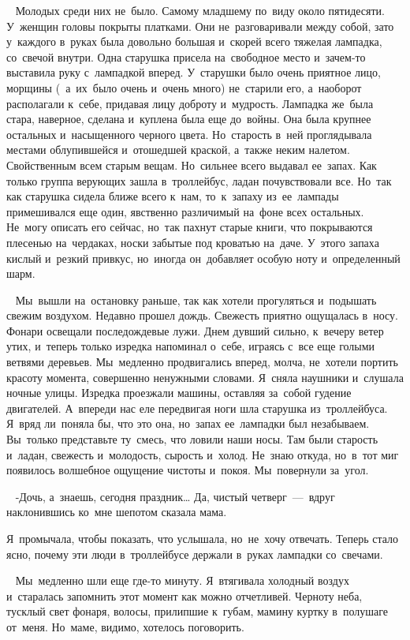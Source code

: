 ~
Молодых среди них не~было.
Самому младшему по~виду около пятидесяти.
У~женщин головы покрыты платками.
Они не~разговаривали между собой, зато у~каждого в~руках была довольно большая и~скорей всего тяжелая лампадка, со~свечой внутри.
Одна старушка присела на~свободное место и~зачем-то выставила руку с~лампадкой вперед.
У~старушки было очень приятное лицо, морщины (~а~их~было очень и~очень много) не~старили его, а~наоборот располагали к~себе, придавая лицу доброту и~мудрость.
Лампадка же~была стара, наверное, сделана и~куплена была еще до~войны.
Она была крупнее остальных и~насыщенного черного цвета.
Но~старость в~ней проглядывала местами облупившейся и~отошедшей краской, а~также неким налетом.
Свойственным всем старым вещам.
Но~сильнее всего выдавал ее~запах.
Как только группа верующих зашла в~троллейбус, ладан почувствовали все.
Но~так как старушка сидела ближе всего к~нам, то~к~запаху из~ее~лампады примешивался еще один, явственно различимый на~фоне всех остальных.
Не~могу описать его сейчас, но~так пахнут старые книги, что покрываются плесенью на~чердаках, носки забытые под кроватью на~даче.
У~этого запаха кислый и~резкий привкус, но~иногда он~добавляет особую ноту и~определенный шарм.

~
Мы~вышли на~остановку раньше, так как хотели прогуляться и~подышать свежим воздухом.
Недавно прошел дождь.
Свежесть приятно ощущалась в~носу.
Фонари освещали последождевые лужи.
Днем дувший сильно, к~вечеру ветер утих, и~теперь только изредка напоминал о~себе, играясь с~все еще голыми ветвями деревьев.
Мы~медленно продвигались вперед, молча, не~хотели портить красоту момента, совершенно ненужными словами.
Я~сняла наушники и~слушала ночные улицы.
Изредка проезжали машины, оставляя за~собой гудение двигателей.
А~впереди нас еле передвигая ноги шла старушка из~троллейбуса.
Я~вряд ли~поняла бы, что это она, но~запах ее~лампадки был незабываем.
Вы~только представьте ту~смесь, что ловили наши носы.
Там были старость и~ладан, свежесть и~молодость, сырость и~холод.
Не~знаю откуда, но~в~тот миг появилось волшебное ощущение чистоты и~покоя.
Мы~повернули за~угол.

~
-Дочь, а~знаешь, сегодня праздник… Да, чистый четверг~---~вдруг наклонившись ко~мне шепотом сказала мама.
 
Я~промычала, чтобы показать, что услышала, но~не~хочу отвечать.
Теперь стало ясно, почему эти люди в~троллейбусе держали в~руках лампадки со~свечами.

~
Мы~медленно шли еще где-то минуту.
Я~втягивала холодный воздух и~старалась запомнить этот момент как можно отчетливей.
Черноту неба, тусклый свет фонаря, волосы, прилипшие к~губам, мамину куртку в~полушаге от~меня.
Но~маме, видимо, хотелось поговорить.
 
